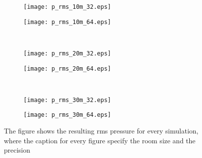 \begin{figure}[H]
\begin{subfigure}[c]{0.5\textwidth}
\texttt{[image: p\_rms\_10m\_32.eps]}
\label{fig:p_rms_10m_32}
\end{subfigure}
\begin{subfigure}[c]{0.5\textwidth}
\texttt{[image: p\_rms\_10m\_64.eps]}
\label{fig:p_rms_10m_64}
\end{subfigure}\\
\hspace{1cm}
\begin{subfigure}[c]{0.5\textwidth}
\texttt{[image: p\_rms\_20m\_32.eps]}
\label{fig:p_rms_20m_32}
\end{subfigure}
\begin{subfigure}[c]{0.5\textwidth}
\texttt{[image: p\_rms\_20m\_64.eps]}
\label{fig:p_rms_20m_64}
\end{subfigure}\\
\hspace{1cm}
\begin{subfigure}[c]{0.5\textwidth}
\texttt{[image: p\_rms\_30m\_32.eps]}
\label{fig:p_rms_30m_32}
\end{subfigure}
\begin{subfigure}[c]{0.5\textwidth}
\texttt{[image: p\_rms\_30m\_64.eps]}
\label{fig:p_rms_30m_64}
\end{subfigure}
\caption{The figure shows the resulting \gls{rms} pressure for every simulation, where the caption for every figure specify the room size and the precision}
		\label{fig:p_rms}
\end{figure}


